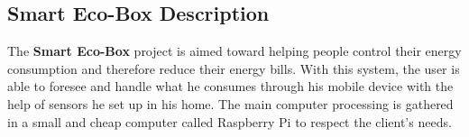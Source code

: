 
\subsection{Smart Eco-Box Description}
%
%


The \textbf{Smart Eco-Box} project is aimed toward helping people control their energy consumption and therefore reduce their energy bills. With this system, the user is able to foresee and handle what he consumes through his mobile device with the help of sensors he set up in his home. The main computer processing is gathered in a small and cheap computer called Raspberry Pi to respect the client's needs.


